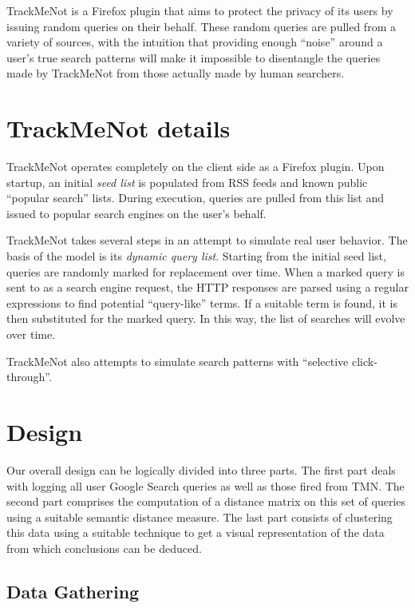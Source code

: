 \documentclass[11pt]{article}
\begin{document}
\begin{multicols}{2}
TrackMeNot is a Firefox plugin that aims to protect the privacy of its users by issuing random queries on their behalf. These random queries are pulled from a variety of sources, with the intuition that providing enough ``noise'' around a user's true search patterns will make it impossible to disentangle the queries made by TrackMeNot from those actually made by human searchers.

\section{TrackMeNot details}
\label{sec:tmn}
TrackMeNot operates completely on the client side as a Firefox plugin. Upon startup, an initial {\it seed list} is populated from RSS feeds and known public ``popular search'' lists. During execution, queries are pulled from this list and issued to popular search engines on the user's behalf.

TrackMeNot takes several steps in an attempt to simulate real user behavior. The basis of the model is its {\it dynamic query list}. Starting from the initial seed list, queries are randomly marked for replacement over time. When a marked query is sent to as a search engine request, the HTTP responses are parsed using a regular expressions to find potential ``query-like'' terms. If a suitable term is found, it is then substituted for the marked query. In this way, the list of searches will evolve over time.

TrackMeNot also attempts to simulate search patterns with ``selective click-through''. 

\section{Design}
\label{sec:design}
Our overall design can be logically divided into three parts. The first part deals with logging all user Google Search queries as well as those fired from TMN. The second part comprises the computation of a distance matrix on this set of queries using a suitable semantic distance measure. The last part consists of clustering this data using a suitable technique to get a visual representation of the data from which conclusions can be deduced.

\subsection{Data Gathering}


\end{multicols}
\end{document}

